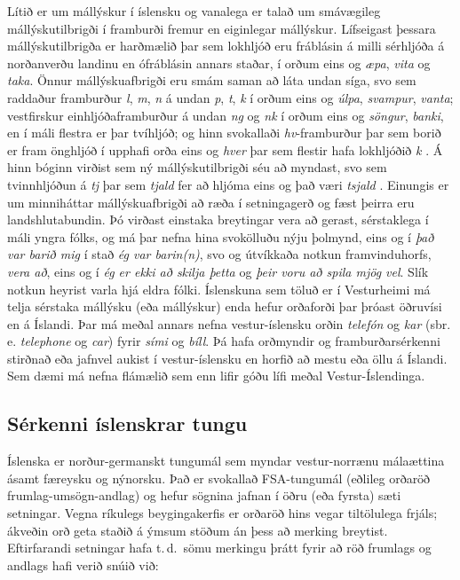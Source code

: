\documentclass{../../metanetpaper}
\begin{document}
\begin{multicols}{2}
Lítið er um mállýskur í íslensku og vanalega er talað um smávægileg mállýskutilbrigði í framburði fremur en eiginlegar mállýskur. Lífseigast þessara mállýskutilbrigða er harðmælið þar sem lokhljóð eru fráblásin á milli sérhljóða á norðanverðu landinu en ófráblásin annars staðar, í orðum eins og \textit{æpa}, \textit{vita} og \textit{taka}. Önnur mállýskuafbrigði eru smám saman að láta undan síga, svo sem raddaður framburður \textit{l}, \textit{m}, \textit{n} á undan \textit{p}, \textit{t}, \textit{k} í orðum eins og \textit{úlpa}, \textit{svampur}, \textit{vanta};  vestfirskur einhljóðaframburður á undan \textit{ng} og \textit{nk} í orðum eins og \textit{söngur}, \textit{banki}, en í máli flestra er þar tvíhljóð; og hinn svokallaði \textit{hv}-framburður þar sem borið er fram önghljóð í upphafi orða eins og \textit{hver} þar sem flestir hafa lokhljóðið \textit{k} \cite{mal1}.  Á hinn bóginn virðist sem ný mállýskutilbrigði séu að myndast, svo sem tvinnhljóðun á \textit{tj} þar sem \textit{tjald} fer að hljóma eins og það væri \textit{tsjald} \cite{tvi1}. Einungis er um minniháttar mállýskuafbrigði að ræða í setningagerð og fæst þeirra eru landshlutabundin. Þó virðast einstaka breytingar vera að gerast, sérstaklega í máli yngra fólks, og má þar nefna hina svokölluðu nýju þolmynd, eins og í \textit{það var barið mig} í stað \textit{ég var barin(n)}, svo og útvíkkaða notkun framvinduhorfs, \textit{vera að}, eins og í \textit{ég er ekki að skilja þetta} og \textit{þeir voru að spila mjög vel}. Slík notkun heyrist varla hjá eldra fólki. Íslenskuna sem töluð er í Vesturheimi má telja sérstaka mállýsku (eða mállýskur) enda hefur orðaforði þar þróast öðruvísi en á Íslandi. Þar má meðal annars nefna vestur-íslensku orðin \textit{telefón} og \textit{kar} (sbr. e. \textit{telephone} og \textit{car}) fyrir \textit{sími} og \textit{bíll}. Þá hafa orðmyndir og framburðarsérkenni stirðnað eða jafnvel aukist í vestur-íslensku en horfið að mestu eða öllu á Íslandi. Sem dæmi má nefna flámælið sem enn lifir góðu lífi meðal Vestur-Íslendinga.

\subsection{Sérkenni íslenskrar tungu}

Íslenska er norður-germanskt tungumál sem myndar vestur-norrænu málaættina ásamt færeysku og nýnorsku. Það er svokallað FSA-tungumál (eðlileg orðaröð frumlag-umsögn-andlag) og hefur sögnina jafnan í öðru (eða fyrsta) sæti setningar. Vegna ríkulegs beygingakerfis er orðaröð hins vegar tiltölulega frjáls; ákveðin orð geta staðið á ýmsum stöðum án þess að merking breytist. Eftirfarandi setningar hafa t.\,d.~sömu merkingu þrátt fyrir að röð frumlags og andlags hafi verið snúið við:


\end{multicols}
\end{document}
